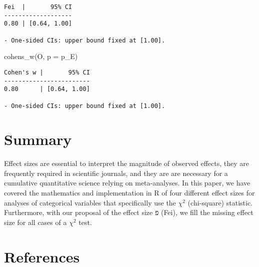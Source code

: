 \documentclass[
]{article}
\newenvironment{Shaded}{\begin{snugshade}}{\end{snugshade}}
\newcommand{\AttributeTok}[1]{\textcolor[rgb]{0.77,0.63,0.00}{#1}}
\newcommand{\FunctionTok}[1]{\textcolor[rgb]{0.00,0.00,0.00}{#1}}
\newcommand{\NormalTok}[1]{#1}
\begin{document}
\begin{verbatim}
Fei  |       95% CI
-------------------
0.80 | [0.64, 1.00]

- One-sided CIs: upper bound fixed at [1.00].
\end{verbatim}

\begin{Shaded}
\begin{Highlighting}[]
\FunctionTok{cohens\_w}\NormalTok{(O, }\AttributeTok{p =}\NormalTok{ p\_E)}
\end{Highlighting}
\end{Shaded}

\begin{verbatim}
Cohen's w |       95% CI
------------------------
0.80      | [0.64, 1.00]

- One-sided CIs: upper bound fixed at [1.00].
\end{verbatim}

\hypertarget{summary}{%
\section{Summary}\label{summary}}

Effect sizes are essential to interpret the magnitude of observed
effects, they are frequently required in scientific journals, and they
are are necessary for a cumulative quantitative science relying on
meta-analyses. In this paper, we have covered the mathematics and
implementation in R of four different effect sizes for analyses of
categorical variables that specifically use the \(\chi^2\) (chi-square)
statistic. Furthermore, with our proposal of the effect size פ (Fei), we
fill the missing effect size for all cases of a \(\chi^2\) test.

\hypertarget{references}{%
\section*{References}\label{references}}
\end{document}
